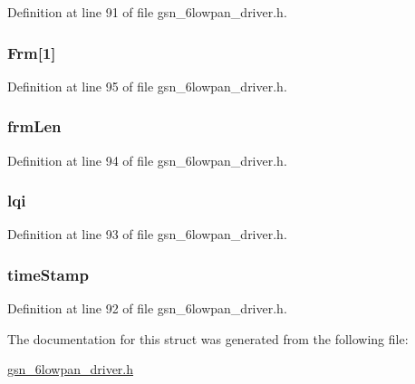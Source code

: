 Definition at line 91 of file gsn\_\-6lowpan\_\-driver.h.

\hypertarget{a00020_a89d3003ccf727f39dc3b93bbe711c857}{
\subsubsection[{Frm}]{ {\bf Frm}\mbox{[}1\mbox{]}}}
\label{a00020_a89d3003ccf727f39dc3b93bbe711c857}


Definition at line 95 of file gsn\_\-6lowpan\_\-driver.h.

\hypertarget{a00020_a8c39fe07938dd92f46a8d5b149780e81}{
\subsubsection[{frmLen}]{ {\bf frmLen}}}
\label{a00020_a8c39fe07938dd92f46a8d5b149780e81}


Definition at line 94 of file gsn\_\-6lowpan\_\-driver.h.

\hypertarget{a00020_a33bfa8f8be6d77e0996567f8b46ce2f7}{
\subsubsection[{lqi}]{ {\bf lqi}}}
\label{a00020_a33bfa8f8be6d77e0996567f8b46ce2f7}


Definition at line 93 of file gsn\_\-6lowpan\_\-driver.h.

\hypertarget{a00020_ae7eca8d649117ff5c69fbfcfa178898f}{
\subsubsection[{timeStamp}]{ {\bf timeStamp}}}
\label{a00020_ae7eca8d649117ff5c69fbfcfa178898f}


Definition at line 92 of file gsn\_\-6lowpan\_\-driver.h.



The documentation for this struct was generated from the following file:\begin{DoxyCompactItemize}
\item 
\hyperlink{a00472}{gsn\_\-6lowpan\_\-driver.h}\end{DoxyCompactItemize}
